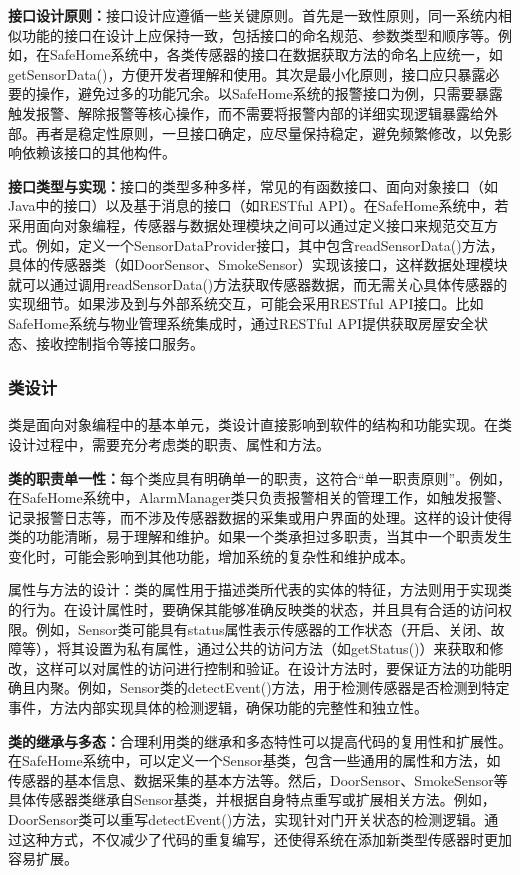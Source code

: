 \textbf{接口设计原则：}接口设计应遵循一些关键原则。首先是一致性原则，同一系统内相似功能的接口在设计上应保持一致，包括接口的命名规范、参数类型和顺序等。例如，在SafeHome系统中，各类传感器的接口在数据获取方法的命名上应统一，如getSensorData()，方便开发者理解和使用。其次是最小化原则，接口应只暴露必要的操作，避免过多的功能冗余。以SafeHome系统的报警接口为例，只需要暴露触发报警、解除报警等核心操作，而不需要将报警内部的详细实现逻辑暴露给外部。再者是稳定性原则，一旦接口确定，应尽量保持稳定，避免频繁修改，以免影响依赖该接口的其他构件。

\textbf{接口类型与实现：}接口的类型多种多样，常见的有函数接口、面向对象接口（如Java中的接口）以及基于消息的接口（如RESTful API）。在SafeHome系统中，若采用面向对象编程，传感器与数据处理模块之间可以通过定义接口来规范交互方式。例如，定义一个SensorDataProvider接口，其中包含readSensorData()方法，具体的传感器类（如DoorSensor、SmokeSensor）实现该接口，这样数据处理模块就可以通过调用readSensorData()方法获取传感器数据，而无需关心具体传感器的实现细节。如果涉及到与外部系统交互，可能会采用RESTful API接口。比如SafeHome系统与物业管理系统集成时，通过RESTful API提供获取房屋安全状态、接收控制指令等接口服务。

\subsubsection{类设计}

类是面向对象编程中的基本单元，类设计直接影响到软件的结构和功能实现。在类设计过程中，需要充分考虑类的职责、属性和方法。

\textbf{类的职责单一性：}每个类应具有明确单一的职责，这符合``单一职责原则''。例如，在SafeHome系统中，AlarmManager类只负责报警相关的管理工作，如触发报警、记录报警日志等，而不涉及传感器数据的采集或用户界面的处理。这样的设计使得类的功能清晰，易于理解和维护。如果一个类承担过多职责，当其中一个职责发生变化时，可能会影响到其他功能，增加系统的复杂性和维护成本。

属性与方法的设计：类的属性用于描述类所代表的实体的特征，方法则用于实现类的行为。在设计属性时，要确保其能够准确反映类的状态，并且具有合适的访问权限。例如，Sensor类可能具有status属性表示传感器的工作状态（开启、关闭、故障等），将其设置为私有属性，通过公共的访问方法（如getStatus()）来获取和修改，这样可以对属性的访问进行控制和验证。在设计方法时，要保证方法的功能明确且内聚。例如，Sensor类的detectEvent()方法，用于检测传感器是否检测到特定事件，方法内部实现具体的检测逻辑，确保功能的完整性和独立性。

\textbf{类的继承与多态：}合理利用类的继承和多态特性可以提高代码的复用性和扩展性。在SafeHome系统中，可以定义一个Sensor基类，包含一些通用的属性和方法，如传感器的基本信息、数据采集的基本方法等。然后，DoorSensor、SmokeSensor等具体传感器类继承自Sensor基类，并根据自身特点重写或扩展相关方法。例如，DoorSensor类可以重写detectEvent()方法，实现针对门开关状态的检测逻辑。通过这种方式，不仅减少了代码的重复编写，还使得系统在添加新类型传感器时更加容易扩展。

